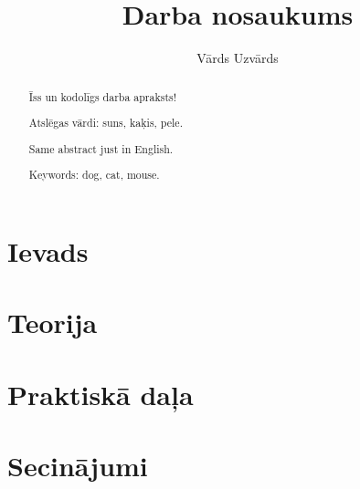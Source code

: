 \documentclass{LU}
\title{Darba nosaukums}
\author{Vārds Uzvārds}
\begin{document}
\maketitle

\begin{abstract}
    Īss un kodolīgs darba apraksts!

    Atslēgas vārdi: suns, kaķis, pele.
\end{abstract}
 

\begin{abstract}
    Same abstract just in English.

    Keywords: dog, cat, mouse.
\end{abstract}


\tableofcontents


\printglossary[type=main,title={Apzīmējumu saraksts},toctitle={Apzīmējumu saraksts}]


\chapter*{Ievads} %
\pagestyle{plain}



\chapter{Teorija}


\chapter{Praktiskā daļa}



\chapter*{Secinājumi}

\end{document}

